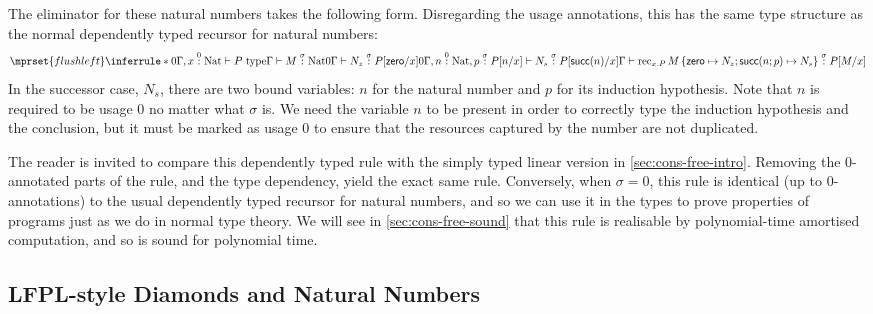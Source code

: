 \documentclass[acmsmall,review,screen,anonymous]{acmart}
\newcommand{\tmRec}{\mathrm{rec}}
\newcommand{\tyNat}{\mathrm{Nat}}
\newcommand{\conZero}{\mathsf{zero}}
\newcommand{\conSucc}{\mathsf{succ}}
\newcommand{\istype}{\mathrm{type}}
\begin{document}
The eliminator for these natural numbers takes the following
form. Disregarding the usage annotations, this has the same type
structure as the normal dependently typed recursor for natural
numbers:
\begin{displaymath}
  \mprset{flushleft}
  \inferrule*
  {0\Gamma, x \stackrel0: \tyNat \vdash P~\istype \\\\
    \Gamma \vdash M \stackrel\sigma: \tyNat \\\\
    0\Gamma \vdash N_z \stackrel\sigma: P[\conZero/x] \\\\
    0\Gamma, n \stackrel0: \tyNat, p \stackrel\sigma: P[n/x] \vdash N_s \stackrel\sigma: P[\conSucc(n)/x]}
  {\Gamma \vdash \tmRec_{x.P}\,M\,\{\conZero \mapsto N_z; \conSucc(n;p) \mapsto N_s\} \stackrel\sigma: P[M/x]}
\end{displaymath}
In the successor case, $N_s$, there are two bound variables: $n$ for
the natural number and $p$ for its induction hypothesis. Note that $n$
is required to be usage $0$ no matter what $\sigma$ is. We need the
variable $n$ to be present in order to correctly type the induction
hypothesis and the conclusion, but it must be marked as usage $0$ to
ensure that the resources captured by the number are not duplicated.

The reader is invited to compare this dependently typed rule with the
simply typed linear version in \autoref{sec:cons-free-intro}. Removing
the $0$-annotated parts of the rule, and the type dependency, yield
the exact same rule. Conversely, when $\sigma = 0$, this rule is
identical (up to $0$-annotations) to the usual dependently typed
recursor for natural numbers, and so we can use it in the types to
prove properties of programs just as we do in normal type theory. We
will see in \autoref{sec:cons-free-sound} that this rule is realisable
by polynomial-time amortised computation, and so is sound for
polynomial time.

\subsection{LFPL-style Diamonds and Natural Numbers}
\label{sec:lfpl-qtt}
\end{document}
